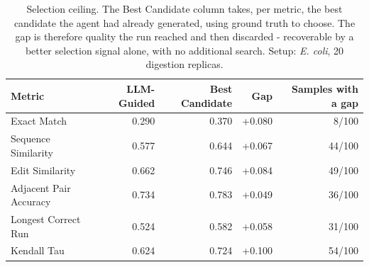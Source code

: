 \begin{table}[!tb]
  \centering
  \caption{Selection ceiling. The Best Candidate column takes, per metric, the best candidate the agent had already generated, using ground truth to choose. The gap is therefore quality the run reached and then discarded - recoverable by a better selection signal alone, with no additional search. Setup: \textnormal{\textnormal{\textit{E. coli}}}, 20 digestion replicas.}
  \label{tab:selection_ceiling_ecoli_r20}
  \begin{tabular}{lrrrr}
    \toprule
    Metric & LLM-Guided & Best Candidate & Gap & Samples with a gap \\
    \midrule
    Exact Match & 0.290 & 0.370 & +0.080 & 8/100 \\
    Sequence Similarity & 0.577 & 0.644 & +0.067 & 44/100 \\
    Edit Similarity & 0.662 & 0.746 & +0.084 & 49/100 \\
    Adjacent Pair Accuracy & 0.734 & 0.783 & +0.049 & 36/100 \\
    Longest Correct Run & 0.524 & 0.582 & +0.058 & 31/100 \\
    Kendall Tau & 0.624 & 0.724 & +0.100 & 54/100 \\
    \bottomrule
  \end{tabular}
\end{table}
